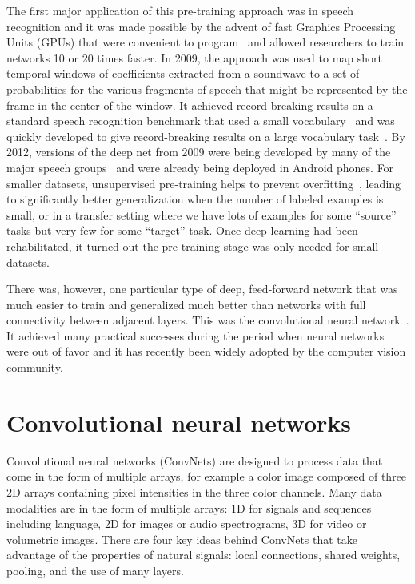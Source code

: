 \documentclass[10pts]{article}
\newcommand{\citep}[1]{\cite{#1}}
\begin{document}
The first major application of this pre-training approach was in
speech recognition and it was made possible by the advent of fast
Graphics Processing Units (GPUs) that were convenient to
program~\citep{RainaICML09-small} and allowed researchers to train
networks 10 or 20 times faster.  In 2009, the approach was used to map
short temporal windows of coefficients extracted from a soundwave to a
set of probabilities for the various fragments of speech that might be
represented by the frame in the center of the window.  It achieved
record-breaking results on a standard speech recognition benchmark
that used a small vocabulary~\citep{TIMITpaper} and was quickly
developed to give record-breaking results on a large vocabulary
task~\citep{Dahl2012}.  By 2012, versions of the deep net from 2009
were being developed by many of the major speech
groups~\citep{Hinton-et-al-2012} and were already being deployed in
Android phones.  For smaller datasets, unsupervised pre-training helps
to prevent overfitting~\citep{Bengio-Courville-Vincent-TPAMI2013},
leading to significantly better generalization when the number of
labeled examples is small, or in a transfer setting where we have lots
of examples for some ``source'' tasks but very few for some ``target''
task.  Once deep learning had been rehabilitated, it turned out the
pre-training stage was only needed for small datasets.

There was, however, one particular type of deep, feed-forward network
that was much easier to train and generalized much better than
networks with full connectivity between adjacent layers. This was the
convolutional neural network~\cite{lecun-90c,lecun-98}. It achieved
many practical successes during the period when neural networks were
out of favor and it has recently been widely adopted by the computer
vision community. 

\section{Convolutional neural networks}

Convolutional neural networks (ConvNets) are designed to process
data that come in the form of multiple arrays, for example a color
image composed of three 2D arrays containing pixel intensities in the
three color channels. Many data modalities are in the form of multiple
arrays: 1D for signals and sequences including language, 2D for images
or audio spectrograms, 3D for video or volumetric images.  There are
four key ideas behind ConvNets that take advantage of the properties
of natural signals: local connections, shared weights,
pooling, and the use of many layers.
\end{document}
